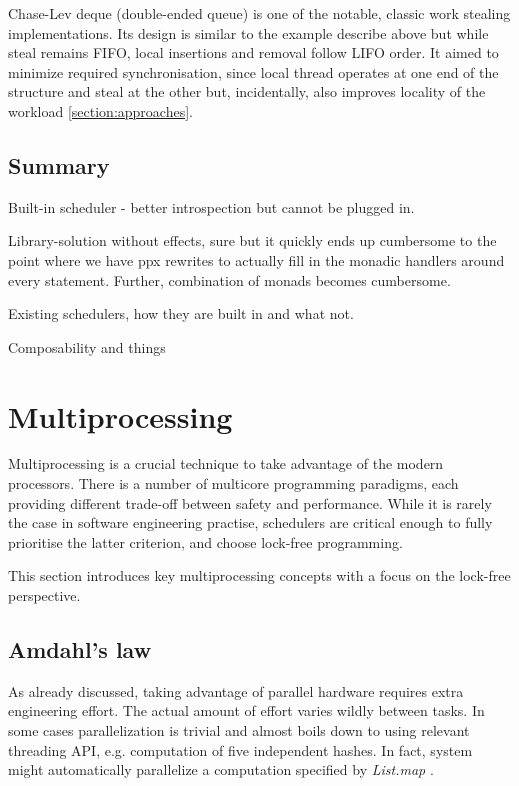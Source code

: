 \documentclass[12pt,a4paper,twoside]{report}
\begin{document}
\label{paragraph:deque}
Chase-Lev deque (double-ended queue) \cite{Chase2005} is one of the notable, classic work stealing implementations. Its design is similar to the example describe above but while steal remains FIFO, local insertions and removal follow LIFO order. It aimed to minimize required synchronisation, since local thread operates at one end of the structure and steal at the other but, incidentally, also improves locality of the workload \ref{section:approaches}. 


\subsection{Summary}
Built-in scheduler - better introspection but cannot be plugged in.

Library-solution without effects, sure but it quickly ends up cumbersome to the point where we have ppx rewrites to actually fill in the monadic handlers around every statement. Further, combination of monads becomes cumbersome. 


Existing schedulers, how they are built in and what not.

Composability and things

\section{Multiprocessing}
\label{section:background_multiprocessing}

Multiprocessing is a crucial technique to take advantage of the modern processors. There is a number of multicore programming paradigms, each providing different trade-off between safety and performance. While it is rarely the case in software engineering practise, schedulers are critical enough to fully prioritise the latter criterion, and choose lock-free programming. 

This section introduces key multiprocessing concepts with a focus on the lock-free perspective. 

\subsection{Amdahl's law}
As already discussed, taking advantage of parallel hardware requires extra engineering effort. The actual amount of effort varies wildly between tasks. In some cases parallelization is trivial and almost boils down to using relevant threading API, e.g. computation of five independent hashes. In fact, system might automatically parallelize a computation specified by \textit{List.map} \cite{OCamllib90:online}. 
\end{document}

